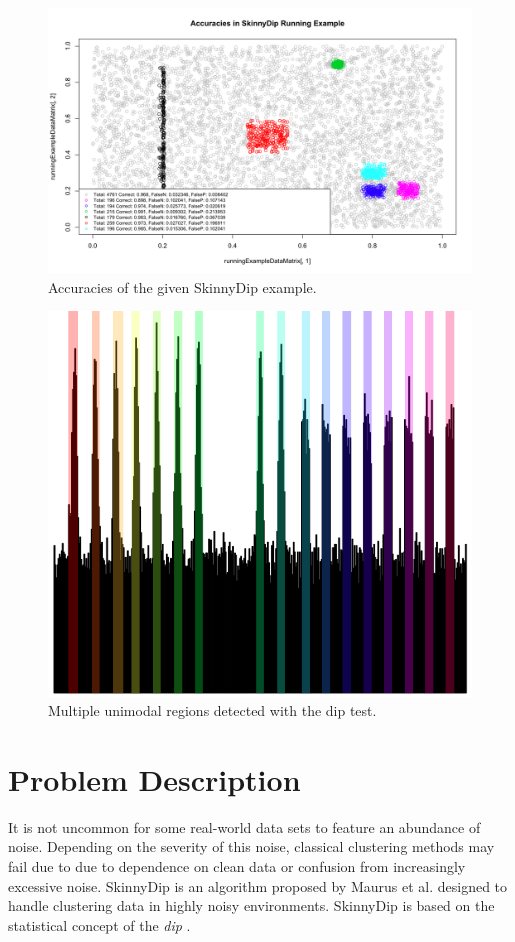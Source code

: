 \documentclass{sig-alternate-05-2015}
\begin{document}
\begin{figure}[t]
\centering
\includegraphics[width=\textwidth]{images/SkinnyDipAccuracy}
\caption{Accuracies of the given SkinnyDip example.}
\label{fig:sdaccuracy}
\end{figure}

\begin{figure}[t]
\centering
\includegraphics[width=\columnwidth]{images/unimodes}
\caption{Multiple unimodal regions detected with the dip test.}
\label{fig:skinnystripes}
\end{figure}






\section{Problem Description}
It is not uncommon for some real-world data sets to feature an abundance of noise. Depending on the severity of this noise, classical clustering methods may fail due to due to dependence on clean data or confusion from increasingly excessive noise. SkinnyDip is an algorithm proposed by Maurus et al.\cite{skinnydip} designed to handle clustering data in highly noisy environments. SkinnyDip is based on the statistical concept of the \textit{dip} \cite{dip}. 
\end{document}
